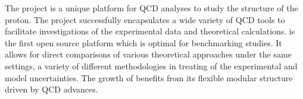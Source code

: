 
\label{sec:summary}
The \fitter project is a unique platform for QCD analyses to study the 
structure of the proton.
The project successfully encapsulates a wide variety
of QCD tools to facilitate investigations of the experimental data
and theoretical calculations. \fitter is the first open source platform which is optimal for benchmarking studies. It allows for direct comparisons of various theoretical approaches under the same settings, a variety of different methodologies in treating of the experimental and model uncertainties. The growth of \fitter benefits from its flexible modular structure driven by QCD advances.


